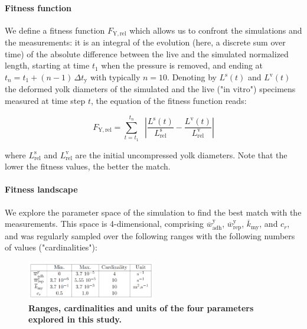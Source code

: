 \paragraph{Fitness function}


We define a fitness function $F_{\mathrm{Y,rel}}$ which allows us to confront the simulations and the measurements: it is an integral of the evolution (here, a discrete sum over time) of the absolute difference between the live and the simulated normalized length, starting at time $t_1$ when the pressure is removed, and ending at $t_n = t_1 + (n-1)\,\Delta\!t_{\mathrm{y}}$ with typically $n=10$. Denoting by $L^{\mathrm{s}}(t)$ and $L^{\mathrm{v}}(t)$ the deformed yolk diameters of the simulated and the live ("in vitro") specimens measured at time step $t$, the equation of the fitness function reads:

$$ F_{\mathrm{Y,rel}} = \sum_{t=t_1}^{t_n} \;\;\left | \frac{L^{\mathrm{s}}(t)}{L^{\mathrm{s}}_{\mathrm{rel}}} - \frac{L^{\mathrm{v}}(t)}{L^{\mathrm{v}}_{\mathrm{rel}}} \right | $$

where $L^{\mathrm{s}}_{\mathrm{rel}}$ and $L^{\mathrm{v}}_{\mathrm{rel}}$ are the initial uncompressed yolk diameters. Note that the lower the fitness values, the better the match.

\paragraph{Fitness landscape}


We explore the parameter space of the simulation to find the best match with the measurements. This space is 4-dimensional, comprising $\overline{w}^{\mathrm{y}}_{\mathrm{adh}}$, $\overline{w}^{\mathrm{y}}_{\mathrm{rep}}$, $\overline{k}_{\mathrm{my}}$, and $c_r$, and was regularly sampled over the following ranges with the following numbers of values ("cardinalities"):
\begin{figure}
\begin{center}
\includegraphics[width=0.5\textwidth]{../../images/Cases_Studies/Case_0_Yolk/parameter_space_table/parameter_space_table.png}
\end{center}
\caption{\textbf{Ranges, cardinalities and units of the four parameters explored in this study.}}
\label{parameter_space_table_parameter_space_table}
\end{figure}

